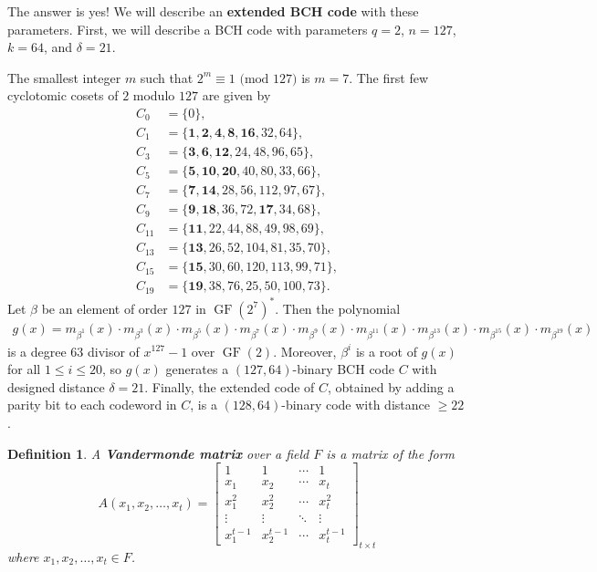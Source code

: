 \documentclass[10pt]{article}
\DeclareMathOperator{\GF}{GF}
\theoremstyle{newstyle}
\newtheorem{defn}[thm]{Definition}
\begin{document}
The answer is yes! We will describe an {\bf extended BCH code} with these parameters. 
First, we will describe a BCH code with parameters $q = 2$, $n = 127$, $k = 64$, and $\delta = 21$. 

The smallest integer $m$ such that $2^m \equiv 1 \text{ (mod 127)}$ is $m = 7$. The first 
few cyclotomic cosets of $2$ modulo $127$ are given by 
\begin{align*}
    C_0 &= \{0\}, \\
    C_1 &= \{\mathbf 1, \mathbf 2, \mathbf{4}, \mathbf{8}, \mathbf{16}, 32, 64\}, \\
    C_3 &= \{\mathbf 3, \mathbf 6, \mathbf{12}, 24, 48, 96, 65\}, \\
    C_5 &= \{\mathbf 5, \mathbf{10}, \mathbf{20}, 40, 80, 33, 66\}, \\
    C_7 &= \{\mathbf 7, \mathbf{14}, 28, 56, 112, 97, 67\}, \\
    C_9 &= \{\mathbf 9, \mathbf{18}, 36, 72, \mathbf{17}, 34, 68\}, \\
    C_{11} &= \{\mathbf{11}, 22, 44, 88, 49, 98, 69\}, \\
    C_{13} &= \{\mathbf{13}, 26, 52, 104, 81, 35, 70\}, \\
    C_{15} &= \{\mathbf{15}, 30, 60, 120, 113, 99, 71\}, \\
    C_{19} &= \{\mathbf{19}, 38, 76, 25, 50, 100, 73\}. 
\end{align*}
Let $\beta$ be an element of order $127$ in $\GF(2^7)^*$. Then the polynomial
\begin{align*}
    g(x) = m_{\beta^1}(x) \cdot m_{\beta^3}(x) \cdot m_{\beta^5}(x) \cdot m_{\beta^7}(x) \cdot m_{\beta^9}(x) \cdot m_{\beta^{11}}(x) \cdot m_{\beta^{13}}(x) \cdot m_{\beta^{15}}(x) \cdot m_{\beta^{19}}(x) 
\end{align*}
is a degree $63$ divisor of $x^{127} - 1$ over $\GF(2)$. Moreover, $\beta^i$ is a root of 
$g(x)$ for all $1 \leq i \leq 20$, so $g(x)$ generates a $(127, 64)$-binary BCH code $C$ with 
designed distance $\delta = 21$. 
Finally, the extended code of $C$, obtained by adding a parity bit to each codeword in $C$, 
is a $(128, 64)$-binary code with distance $\geq 22$. 

\begin{defn}
A {\bf Vandermonde matrix} over a field $F$ is a matrix of the form 
\[ A(x_1, x_2, \dots, x_t) = \begin{bmatrix} 1 & 1 & \cdots & 1 \\ 
x_1 & x_2 & \cdots & x_t \\ 
x_1^2 & x_2^2 & \cdots & x_t^2 \\
\vdots & \vdots & \ddots & \vdots \\
x_1^{t-1} & x_2^{t-1} & \cdots & x_t^{t-1} \end{bmatrix}_{t\times t} \]
where $x_1, x_2, \dots, x_t \in F$. 
\end{defn}
\end{document}
